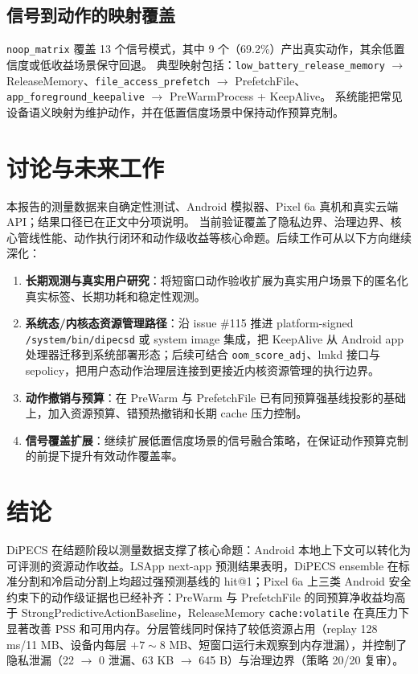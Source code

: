\documentclass[12pt,a4paper]{article}
\begin{document}
\subsection{信号到动作的映射覆盖}\label{subsec:mapping}

\texttt{noop\_matrix} 覆盖 13 个信号模式，其中 9 个（69.2\%）产出真实动作，其余低置信度或低收益场景保守回退。
典型映射包括：\texttt{low\_battery\_release\_memory} $\rightarrow$ ReleaseMemory、\texttt{file\_access\_prefetch} $\rightarrow$ PrefetchFile、\texttt{app\_foreground\_keepalive} $\rightarrow$ PreWarmProcess + KeepAlive。
系统能把常见设备语义映射为维护动作，并在低置信度场景中保持动作预算克制。

\section{讨论与未来工作}\label{sec:future}

本报告的测量数据来自确定性测试、Android 模拟器、Pixel 6a 真机和真实云端 API；结果口径已在正文中分项说明。
当前验证覆盖了隐私边界、治理边界、核心管线性能、动作执行闭环和动作级收益等核心命题。后续工作可从以下方向继续深化：

\begin{enumerate}[label=(\arabic*)]
  \item \textbf{长期观测与真实用户研究}：将短窗口动作验收扩展为真实用户场景下的匿名化真实标签、长期功耗和稳定性观测。
  \item \textbf{系统态/内核态资源管理路径}：沿 issue \#115 推进 platform-signed \texttt{/system/bin/dipecsd} 或 system image 集成，把 KeepAlive 从 Android app 处理器迁移到系统部署形态；后续可结合 \texttt{oom\_score\_adj}、lmkd 接口与 sepolicy，把用户态动作治理层连接到更接近内核资源管理的执行边界。
  \item \textbf{动作撤销与预算}：在 PreWarm 与 PrefetchFile 已有同预算强基线投影的基础上，加入资源预算、错预热撤销和长期 cache 压力控制。
  \item \textbf{信号覆盖扩展}：继续扩展低置信度场景的信号融合策略，在保证动作预算克制的前提下提升有效动作覆盖率。
\end{enumerate}

\section{结论}\label{sec:conclusion}

DiPECS 在结题阶段以测量数据支撑了核心命题：Android 本地上下文可以转化为可评测的资源动作收益。LSApp next-app 预测结果表明，DiPECS ensemble 在标准分割和冷启动分割上均超过强预测基线的 hit@1；Pixel 6a 上三类 Android 安全约束下的动作级证据也已经补齐：PreWarm 与 PrefetchFile 的同预算净收益均高于 StrongPredictiveActionBaseline，ReleaseMemory \texttt{cache:volatile} 在真压力下显著改善 PSS 和可用内存。分层管线同时保持了较低资源占用（replay 128 ms/11 MB、设备内每层 $+7\sim8$ MB、短窗口运行未观察到内存泄漏），并控制了隐私泄漏（22 $\rightarrow$ 0 泄漏、63 KB $\rightarrow$ 645 B）与治理边界（策略 20/20 复审）。
\end{document}
